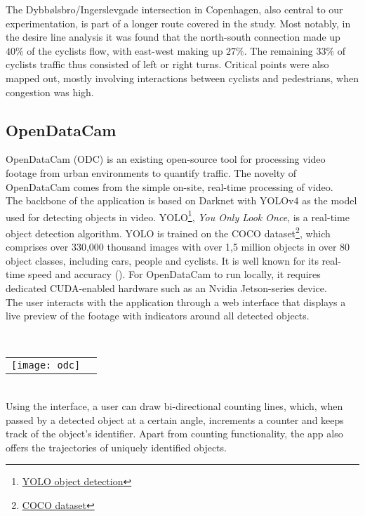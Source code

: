 The Dybbølsbro/Ingerslevgade intersection in Copenhagen, also central to our experimentation, is part of a longer route covered in the study.
Most notably, in the desire line analysis it was found that the north-south connection made up $40\%$ of the cyclists flow, with east-west making up
$27\%$. The remaining $33\%$ of cyclists traffic thus consisted of left or right turns.
Critical points were also mapped out, mostly involving interactions between cyclists and pedestrians, when congestion was high.



\subsection{OpenDataCam}
OpenDataCam (ODC) is an existing open-source tool for processing video footage from urban environments to quantify
traffic. The novelty of OpenDataCam comes from the simple on-site, real-time processing of video. 
\ \\

The backbone of the application is based on Darknet with YOLOv4 as the model used for detecting objects in video.
YOLO\footnote{\href{https://pjreddie.com/darknet/yolo/}{YOLO object detection}}, \textit{You Only Look Once}, is a real-time object detection algorithm. 
YOLO is trained on the COCO dataset\footnote{\href{https://cocodataset.org}{COCO dataset}}, which comprises over 330,000 thousand images
with over 1,5 million objects in over 80 object classes, including cars, people and cyclists. 
It is well known for its real-time speed and accuracy (\cite{redmon2016look}). 
For OpenDataCam to run locally, it requires dedicated CUDA-enabled hardware such as an Nvidia Jetson-series device. 
\ \\

The user interacts with the application through a web interface that displays a live preview of the footage with
indicators around all detected objects.

\ \\
\raggedbottom
\noindent
\begin{tabular}{@{}cc}
\texttt{[image: odc]} 
\end{tabular}
\ \\

Using the interface, a user can draw bi-directional counting lines, which, when passed by a detected object at a certain angle, 
increments a counter and keeps track of the object's identifier. Apart from counting functionality, the app also offers the trajectories of uniquely identified objects. 

\raggedbottom